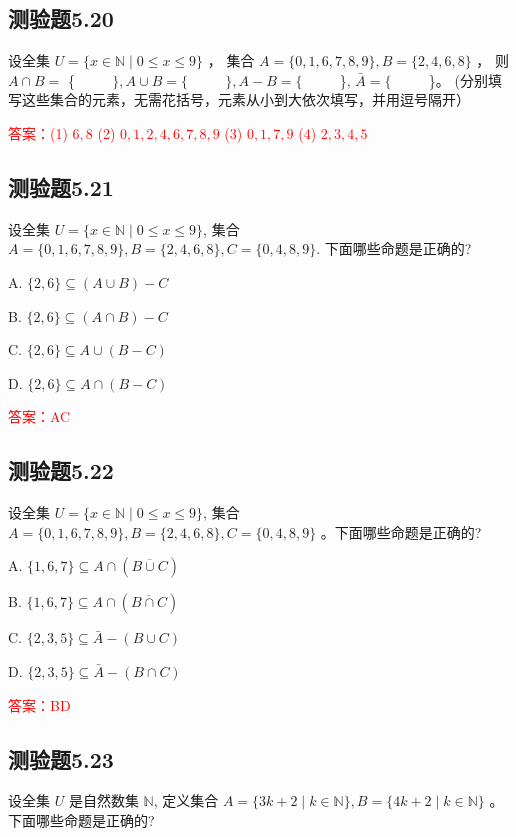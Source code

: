 \documentclass[UTF8, heading=true]{ctexart}
\begin{document}
\subsection{测验题5.20}

设全集 $U=\{x \in \mathbb{N} \mid 0 \leq x \leq 9\}$ ，
集合 $A=\{0,1,6,7,8,9\}, B=\{2,4,6,8\}$ ，
则 $A \cap B=$ \{ $\qquad$ $\}, A \cup B=\{$ $\qquad$ $\}, A-B=\{$ $\qquad$ \}, $\bar{A}=\{$ $\qquad$ \}。 (分别填写这些集合的元素，无需花括号，元素从小到大依次填写，并用逗号隔开）

\textcolor{red}{答案：(1) $6,8$
(2) $0,1,2,4,6,7,8,9$
(3) $0,1,7,9$
(4) $2,3,4,5$}


\subsection{测验题5.21}

设全集 $U=\{x \in \mathbb{N} \mid 0 \leq x \leq 9\}$, 集合 $A=\{0,1,6,7,8,9\}, B=\{2,4,6,8\}, C=\{0,4,8,9\}$. 下面哪些命题是正确的?

A. $\{2,6\} \subseteq(A \cup B)-C$

B. $\{2,6\} \subseteq(A \cap B)-C$

C. $\{2,6\} \subseteq A \cup(B-C)$

D. $\{2,6\} \subseteq A \cap(B-C)$

\textcolor{red}{答案：AC}

\subsection{测验题5.22}

设全集 $U=\{x \in \mathbb{N} \mid 0 \leq x \leq 9\}$, 
集合 $A=\{0,1,6,7,8,9\}, B=\{2,4,6,8\}, C=\{0,4,8,9\}$ 。下面哪些命题是正确的?

A. $\{1,6,7\} \subseteq A \cap(\overline{B \cup C})$

B. $\{1,6,7\} \subseteq A \cap(\overline{B \cap C})$

C. $\{2,3,5\} \subseteq \bar{A}-(B \cup C)$

D. $\{2,3,5\} \subseteq \bar{A}-(B \cap C)$

\textcolor{red}{答案：BD}

\subsection{测验题5.23}
设全集 $U$ 是自然数集 $\mathbb{N}$, 定义集合 $A=\{3 k+2 \mid k \in \mathbb{N}\}, B=\{4 k+2 \mid k \in \mathbb{N}\}$ 。下面哪些命题是正确的?
\end{document}
